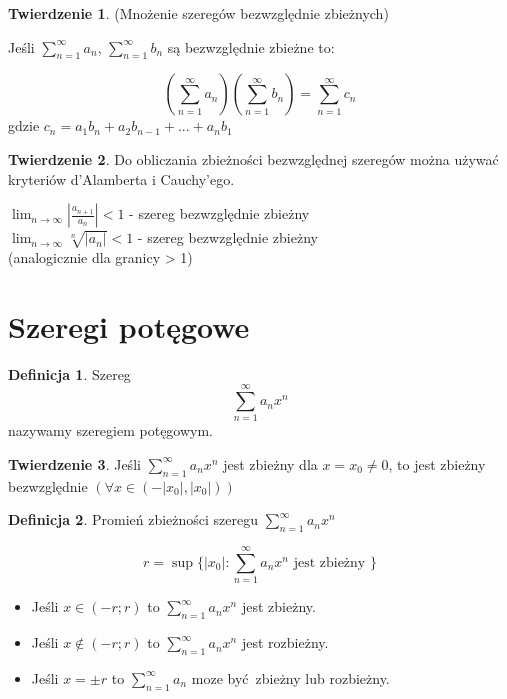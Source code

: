\documentclass{article}
\theoremstyle{definition}
\newtheorem{de}{Definicja}[subsection]
\theoremstyle{definition}
\newtheorem{tw}{Twierdzenie}[subsection]
\theoremstyle{definition}
\begin{document}
\begin{tw}
(Mnożenie szeregów bezwzględnie zbieżnych)

Jeśli $ \sum_{n=1}^{\infty}a_n $, $ \sum_{n=1}^{\infty}b_n $
są bezwzględnie zbieżne to:

$$
(\sum_{n=1}^{\infty}a_n)  (\sum_{n=1}^{\infty}b_n) = \sum_{n=1}^{\infty}c_n 
$$
gdzie $ c_n = a_1b_n + a_2b_{n-1} + ... + a_nb_1 $
\end{tw}
 
\begin{tw}
Do obliczania zbieżności bezwzględnej szeregów można używać kryteriów
d'Alamberta i Cauchy'ego.
\begin{center}
$ \lim_{n \to \infty} |\frac{a_{n+1}}{a_n}| < 1 $ - szereg bezwzględnie zbieżny\\
$ \lim_{n \to \infty} \sqrt[n]{|a_n|} < 1 $ -       szereg bezwzględnie zbieżny\\
(analogicznie dla granicy > 1)
\end{center}
\end{tw}

\section{Szeregi potęgowe}

\begin{de}
Szereg
$$
\sum_{n=1}^{\infty}a_nx^n
$$
nazywamy szeregiem potęgowym.
\end{de}

\begin{tw}
Jeśli $ \sum_{n=1}^{\infty}a_nx^n $ jest zbieżny dla $x=x_0 \neq 0$, to jest zbieżny bezwzględnie
$ (\forall x \in (-|x_0|,|x_0|)) $
\end{tw}

\begin{de}
Promień zbieżności szeregu $ \sum_{n=1}^{\infty}a_nx^n $

$$ r = \sup\{|x_0|: \sum_{n=1}^{\infty}a_nx^n \text{ jest zbieżny }\} $$

\begin{itemize}
\item Jeśli $x \in (-r; r)$ to $ \sum_{n=1}^{\infty}a_nx^n $ jest zbieżny.
\item Jeśli $x \notin (-r; r)$ to $ \sum_{n=1}^{\infty}a_nx^n $ jest rozbieżny.
\item Jeśli $x = \pm r $ to $ \sum_{n=1}^{\infty}a_n $ moze być zbieżny lub rozbieżny.
\end{itemize}

\end{de}
\end{document}
